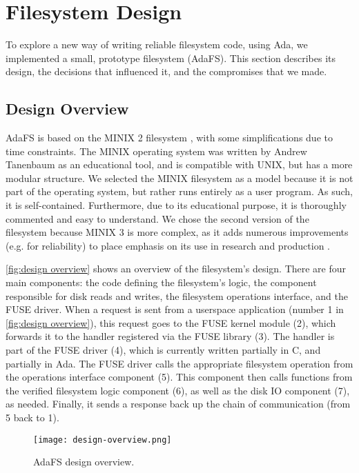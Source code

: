 \section{Filesystem Design}
To explore a new way of writing reliable filesystem code, using Ada, we implemented a small, prototype filesystem (AdaFS).
This section describes its design, the decisions that influenced it, and the compromises that we made.

\subsection{Design Overview}
AdaFS is based on the MINIX 2 filesystem \cite{tanenbaum1997}, with some simplifications due to time constraints.
The MINIX operating system was written by Andrew Tanenbaum as an educational tool, and is compatible with UNIX, but has a more modular structure.
We selected the MINIX filesystem as a model because it is not part of the operating system, but rather runs entirely as a user program.
As such, it is self-contained.
Furthermore, due to its educational purpose, it is thoroughly commented and easy to understand.
We chose the second version of the filesystem because MINIX 3 is more complex, as it adds numerous improvements (e.g. for reliability) to place emphasis on its use in research and production \cite{minix3history}.

\autoref{fig:design overview} shows an overview of the filesystem's design.
There are four main components: the code defining the filesystem's logic, the component responsible for disk reads and writes, the filesystem operations interface, and the FUSE driver.
When a request is sent from a userspace application (number 1 in \autoref{fig:design overview}), this request goes to the FUSE kernel module (2), which forwards it to the handler registered via the FUSE library (3).
The handler is part of the FUSE driver (4), which is currently written partially in C, and partially in Ada.
The FUSE driver calls the appropriate filesystem operation from the operations interface component (5).
This component then calls functions from the verified filesystem logic component (6), as well as the disk IO component (7), as needed.
Finally, it sends a response back up the chain of communication (from 5 back to 1).

\begin{figure}[tb]
  \centering
  \texttt{[image: design-overview.png]}
  \caption{AdaFS design overview.}
  \label{fig:design overview}
\end{figure}


